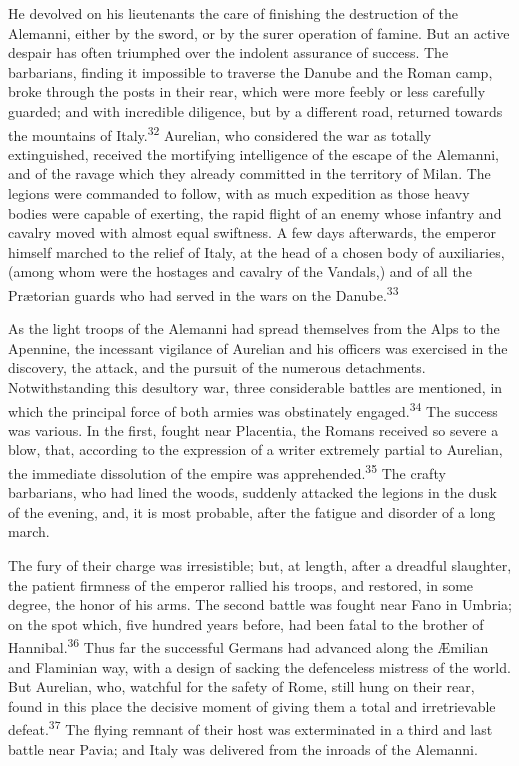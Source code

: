He devolved on his lieutenants the care of finishing the
destruction of the Alemanni, either by the sword, or by the surer
operation of famine. But an active despair has often triumphed
over the indolent assurance of success. The barbarians, finding
it impossible to traverse the Danube and the Roman camp, broke
through the posts in their rear, which were more feebly or less
carefully guarded; and with incredible diligence, but by a
different road, returned towards the mountains of Italy.\textsuperscript{32}
Aurelian, who considered the war as totally extinguished,
received the mortifying intelligence of the escape of the
Alemanni, and of the ravage which they already committed in the
territory of Milan. The legions were commanded to follow, with as
much expedition as those heavy bodies were capable of exerting,
the rapid flight of an enemy whose infantry and cavalry moved
with almost equal swiftness. A few days afterwards, the emperor
himself marched to the relief of Italy, at the head of a chosen
body of auxiliaries, (among whom were the hostages and cavalry of
the Vandals,) and of all the Prætorian guards who had served in
the wars on the Danube.\textsuperscript{33}



As the light troops of the Alemanni had spread themselves from
the Alps to the Apennine, the incessant vigilance of Aurelian and
his officers was exercised in the discovery, the attack, and the
pursuit of the numerous detachments. Notwithstanding this
desultory war, three considerable battles are mentioned, in which
the principal force of both armies was obstinately engaged.\textsuperscript{34}
The success was various. In the first, fought near Placentia, the
Romans received so severe a blow, that, according to the
expression of a writer extremely partial to Aurelian, the
immediate dissolution of the empire was apprehended.\textsuperscript{35} The
crafty barbarians, who had lined the woods, suddenly attacked the
legions in the dusk of the evening, and, it is most probable,
after the fatigue and disorder of a long march.

The fury of their charge was irresistible; but, at length, after
a dreadful slaughter, the patient firmness of the emperor rallied
his troops, and restored, in some degree, the honor of his arms.
The second battle was fought near Fano in Umbria; on the spot
which, five hundred years before, had been fatal to the brother
of Hannibal.\textsuperscript{36} Thus far the successful Germans had advanced
along the Æmilian and Flaminian way, with a design of sacking the
defenceless mistress of the world. But Aurelian, who, watchful
for the safety of Rome, still hung on their rear, found in this
place the decisive moment of giving them a total and
irretrievable defeat.\textsuperscript{37} The flying remnant of their host was
exterminated in a third and last battle near Pavia; and Italy was
delivered from the inroads of the Alemanni.

